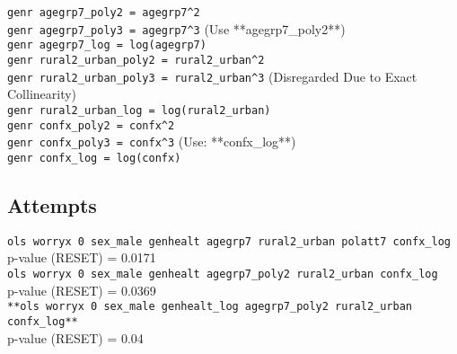 \documentclass[11pt, english]{article}
\begin{document}
	\verb|genr agegrp7_poly2 = agegrp7^2|\\
	\verb|genr agegrp7_poly3 = agegrp7^3| (Use **agegrp7\_poly2**)\\
	\verb|genr agegrp7_log = log(agegrp7)|\\

	\verb|genr rural2_urban_poly2 = rural2_urban^2|\\
	\verb|genr rural2_urban_poly3 = rural2_urban^3| (Disregarded Due to Exact Collinearity)\\
	\verb|genr rural2_urban_log = log(rural2_urban)|\\

	\verb|genr confx_poly2 = confx^2|\\
	\verb|genr confx_poly3 = confx^3| (Use: **confx\_log**)\\
	\verb|genr confx_log = log(confx)|

	\subsection{Attempts}

	\verb|ols worryx 0 sex_male genhealt agegrp7 rural2_urban polatt7 confx_log|\\
	p-value (RESET) = 0.0171\\

	\verb|ols worryx 0 sex_male genhealt agegrp7_poly2 rural2_urban confx_log|\\
	p-value (RESET) = 0.0369\\

	\verb|**ols worryx 0 sex_male genhealt_log agegrp7_poly2 rural2_urban confx_log**|\\
	p-value (RESET) = 0.04
\end{document}
